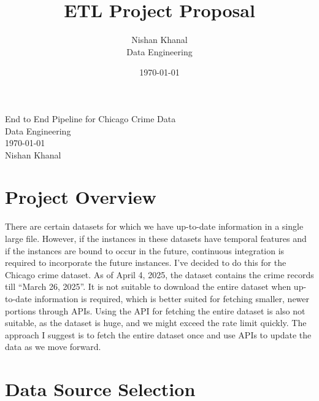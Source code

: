 \documentclass{article}
\title{\textbf{ETL Project Proposal}}
\author{Nishan Khanal \\
Data Engineering}
\date{\today}
\begin{document}
\begin{titlepage}
    \centering
    \vspace*{2in}
    
    {\LARGE
    \vspace{1in}
    End to End Pipeline for Chicago Crime Data \\ 
    
    \vspace{0.5cm}
    Data Engineering\\
    \vspace{0.5cm}
    }%
    \Large{
        \vskip1cm
        \today\\
        \vskip0.3cm
        Nishan Khanal\\
    }
       
\end{titlepage}

\tableofcontents
\newpage


\section{Project Overview}
There are certain datasets for which we have up-to-date information in a single large file. However, if the instances in these datasets have temporal features and if the instances are bound to occur in the future, continuous integration is required to incorporate the future instances. I’ve decided to do this for the Chicago crime dataset. As of April 4, 2025, the dataset contains the crime records till “March 26, 2025”. It is not suitable to download the entire dataset when up-to-date information is required, which is better suited for fetching smaller, newer portions through APIs. Using the API for fetching the entire dataset is also not suitable, as the dataset is huge, and we might exceed the rate limit quickly. The approach I suggest is to fetch the entire dataset once and use APIs to update the data as we move forward.

\section{Data Source Selection}
\end{document}
